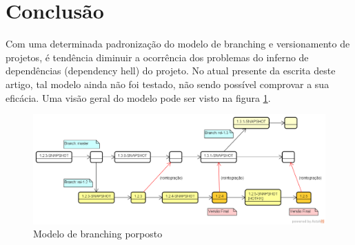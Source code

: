 \section{Conclus{\~a}o}
\label{sec:conclusao}
Com uma determinada padroniza{\c c}{\~a}o do modelo de branching e versionamento de projetos, {\'e} tend{\^e}ncia diminuir a ocorr{\^e}ncia dos problemas do inferno de depend{\^e}ncias (dependency hell) do projeto. No atual presente da escrita deste artigo, tal modelo ainda n{\~a}o foi testado, n{\~a}o sendo poss{\'i}vel comprovar a sua efic{\'a}cia. Uma vis{\~a}o geral do modelo pode ser visto na figura \ref{fig:branching}.

\begin{figure}[h!]
	\centering
	\includegraphics[width=1\linewidth]{img/branching_otojr}
	\caption[Modelo de branching]{Modelo de branching porposto}
	\label{fig:branching}
\end{figure}